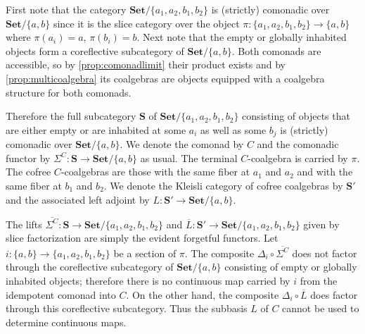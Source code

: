\documentclass[11pt, oneside, article]{memoir}
\theoremstyle{plain}
\theoremstyle{definition}
\theoremstyle{remark}
\newenvironment{counterexample}
{\renewcommand\qedsymbol{$\lrcorner$}%
  \pushQED{\qed}\mycounterexample}
{\popQED\endmycounterexample}
\newcommand{\namedcat}[1]{\mathbf{#1}}
\newcommand{\cat}[1]{\mathbf{#1}}
\newcommand{\Set}{\namedcat{Set}}
\newcommand{\ptlift}[1]{\overline{#1}}
\newcommand{\carr}{\Sigma}
\newcommand{\reindex}[1]{\Delta_{#1}}
\newcommand{\car}[1]{\carr^{#1}}
\newcommand{\carC}{\car{\cC}}
\newcommand{\setof}[1]{\{#1\}}
\newcommand{\cmnd}[1]{{#1}}
\newcommand{\cC}{\cmnd{C}}
\newcommand{\bS}{\cat{S}}
\begin{document}
\begin{counterexample}[Non-universal subbasis]\label{cex:nonuniversal}
  First note that the category $\Set/{\setof{a_1, a_2, b_1, b_2}}$ is
  (strictly) comonadic over $\Set/{\setof{a, b}}$ since it is the
  slice category over the object
  $\pi \colon \setof{a_1, a_2, b_1, b_2} \to \setof{a,b}$ where
  $\pi(a_i) = a$, $\pi(b_i) = b$. Next note that the empty or globally
  inhabited objects form a coreflective subcategory of
  $\Set/\setof{a, b}$. Both comonads are accessible, so by
  \cref{prop:comonadlimit} their product exists and by
  \cref{prop:multicoalgebra} its coalgebras are objects equipped with
  a coalgebra structure for both comonads.

  Therefore the full subcategory $\bS$ of
  $\Set/{\setof{a_1, a_2, b_1, b_2}}$ consisting of objects that are
  either empty or are inhabited at some $a_i$ as well as some $b_j$ is
  (strictly) comonadic over $\Set/{\setof{a, b}}$. We denote the
  comonad by $\cC$ and the comonadic functor by
  $\carC \colon \bS \to \Set/{\setof{a, b}}$ as usual. The terminal
  $\cC$-coalgebra is carried by $\pi$. The cofree $\cC$-coalgebras are
  those with the same fiber at $a_1$ and $a_2$ and with the same fiber
  at $b_1$ and $b_2$. We denote the Kleisli category of cofree
  coalgebras by $\bS'$ and the associated left adjoint by
  $L \colon \bS' \to \Set/{\setof{a, b}}$.

  The lifts
  $\ptlift{\carC} \colon \bS \to \Set/{\setof{a_1, a_2, b_1, b_2}}$
  and $\ptlift{L} \colon \bS' \to \Set/{\setof{a_1, a_2, b_1, b_2}}$
  given by slice factorization are simply the evident forgetful
  functors.  Let
  $i \colon \setof{a, b} \to \setof{a_1, a_2, b_1, b_2}$ be a section
  of $\pi$. The composite $\reindex{i} \circ \ptlift{\carC}$ does not
  factor through the coreflective subcategory of $\Set/\setof{a, b}$
  consisting of empty or globally inhabited objects; therefore there
  is no continuous map carried by $i$ from the idempotent comonad into
  $\cC$. On the other hand, the composite
  $\reindex{i} \circ \ptlift{L}$ does factor through this coreflective
  subcategory. Thus the subbasis $L$ of $\cC$ cannot be used
  to determine continuous maps.
\end{counterexample}
\end{document}
